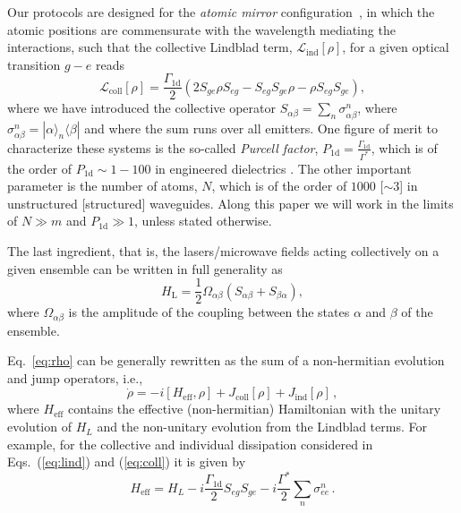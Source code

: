 \documentclass[twocolumn,pra,aps,superscriptaddress,showpacs]{revtex4-1}
\newcommand{\ket}[1]{|#1\rangle}
\newcommand{\bra}[1]{\langle #1|}
\def\oned{\mathrm{1d}}
\begin{document}
Our protocols are designed for the \emph{atomic mirror} configuration~\cite{chang12a,corzo16a,sorensen16a}, in which the atomic positions are commensurate with the wavelength mediating the interactions, such that the collective Lindblad term, $\mathcal{L}_\mathrm{ind} \left[ \rho \right]$, for a given optical transition $g-e$ reads
%
\begin{equation}\label{eq:coll}
\mathcal{L} _\mathrm{coll} \left[ \rho \right]
	= \frac{\Gamma_\oned}{2} 
	\left( 2 S_{ge} \rho S_{eg} - S_{eg} S_{ge} \rho - \rho S_{eg} S_{ge}\right),
\end{equation}
%
where we have introduced the collective operator $S_{\alpha \beta} = \sum_n \sigma_{\alpha \beta}^n$, where $\sigma_{\alpha \beta}^n = \ket{\alpha}_n \bra{\beta}$ and where the sum runs over all emitters. One figure of merit to characterize these systems is the so-called \emph{Purcell factor}, $P_\oned=\frac{\Gamma_\oned}{\Gamma^{*}}$, which is of the order of $P_\oned \sim 1 - 100$ in engineered dielectrics \cite{hughes09a,laucht12,lodahl15,yu14a,goban15a}. The other important parameter is the number of atoms, $N$, which is of the order of $1000$ [$\sim 3$] in unstructured [structured] waveguides. Along this paper we will work in the limits of $N\gg m$ and $P_\oned\gg 1$, unless stated otherwise. 

The last ingredient, that is, the lasers/microwave fields acting collectively on a given ensemble can be written in full generality as
%
\begin{equation}
H_\mathrm{L} 
	= \frac{1}{2} \Omega_{\alpha \beta} \left(  S_{\alpha \beta}+ S_{\beta \alpha} \right),
\end{equation}
%
where $\Omega_{\alpha \beta}$ is the amplitude of the coupling between the states $\alpha$ and $\beta$ of the ensemble.

Eq.~\ref{eq:rho} can be generally rewritten as the sum of a non-hermitian evolution and jump operators, i.e.,
%
\begin{equation} \label{eq:effrho}
\dot{\rho}
	= -i\left[H_\mathrm{eff},\rho\right]+J_\mathrm{coll}[\rho]+J_\mathrm{ind}[\rho]\,,
\end{equation}
%
where $H_\mathrm{eff}$ contains the effective (non-hermitian) Hamiltonian with the unitary evolution of $H_L$ and the non-unitary evolution from the Lindblad terms. For example, for the collective and individual dissipation considered in Eqs.~(\ref{eq:lind}) and (\ref{eq:coll}) it is given by
%
\begin{equation}\label{eq:eff}
H_\mathrm{eff}
	= H_L - i\frac{\Gamma_\oned}{2}S_{eg} S_{ge}-i\frac{\Gamma^*}{2}\sum_{n}\sigma^n_{ee}\,.
\end{equation}
\end{document}
